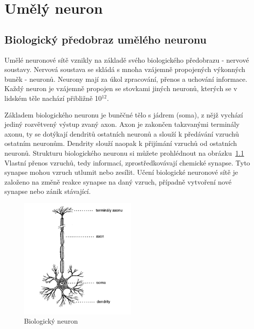 \documentclass[11pt,twoside,a4paper]{book}
\begin{document}
\chapter{Umělý neuron}
\section{Biologický předobraz umělého neuronu}
Umělé neuronové sítě vznikly na základě svého biologického předobrazu - nervové soustavy. Nervová soustava se skládá s mnoha vzájemně propojených výkonných buněk - neuronů. Neurony mají za úkol zpracování, přenos a uchování informace. Každý neuron je vzájemně propojen se stovkami jiných neuronů, kterých se v lidském těle nachází přibližně 10\begin{math} ^{12}\end{math}.\cite{skripta}

Základem biologického neuronu je buněčné tělo s jádrem (soma), z nějž vychází jediný rozvětvený výstup zvaný axon. Axon je zakončen takzvanými terminály axonu, ty se dotýkají dendritů ostatních neuronů a slouží k předávání vzruchů ostatním neuronům. Dendrity slouží naopak k přijímání vzruchů od ostatních neuronů. Strukturu biologického neuronu si můžete prohlédnout na obrázku~\ref{fig:bioneuron} Vlastní přenos vzruchů, tedy informací, zprostředkovávají chemické synapse. Tyto synapse mohou vzruch utlumit nebo zesílit. Učení biologické neuronové sítě je založeno na změně reakce synapse na daný vzruch, případně vytvoření nové synapse nebo zánik stávající.

\begin{figure}[!h]
\begin{center}
\includegraphics[height=6cm]{figures/bioneuron.png}
\caption{Biologický neuron\cite{teoret}}
\label{fig:bioneuron}
\end{center}
\end{figure}
\end{document}
